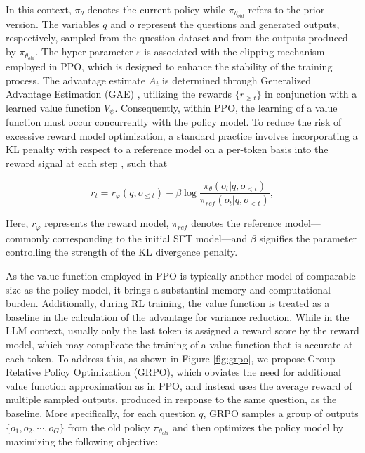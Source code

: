 \begin{itemize}[topsep=0pt]
\begin{itemize}[topsep=0pt]
In this context, $\pi_{\theta}$ denotes the current policy while $\pi_{\theta_{old}}$ refers to the prior version. The variables $q$ and $o$ represent the questions and generated outputs, respectively, sampled from the question dataset and from the outputs produced by $\pi_{\theta_{old}}$. The hyper-parameter $\varepsilon$ is associated with the clipping mechanism employed in PPO, which is designed to enhance the stability of the training process. The advantage estimate $A_t$ is determined through Generalized Advantage Estimation (GAE) \citep{gae}, utilizing the rewards $\{r_{\ge t}\}$ in conjunction with a learned value function $V_{\psi}$. Consequently, within PPO, the learning of a value function must occur concurrently with the policy model. To reduce the risk of excessive reward model optimization, a standard practice involves incorporating a KL penalty with respect to a reference model on a per-token basis into the reward signal at each step \citep{ouyang2022training}, such that

\begin{equation}
    r_{t} = r_\varphi(q, o_{\le t}) - \beta \log\frac{\pi_{\theta}(o_{t}|q, o_{<t})}{\pi_{ref}(o_{t}|q, o_{<t})},
\label{eq:PPO-reward}
\end{equation}

Here, $r_\varphi$ represents the reward model, $\pi_{ref}$ denotes the reference model—commonly corresponding to the initial SFT model—and $\beta$ signifies the parameter controlling the strength of the KL divergence penalty.

As the value function employed in PPO is typically another model of comparable size as the policy model, it brings a substantial memory and computational burden. Additionally, during RL training, the value function is treated as a baseline in the calculation of the advantage for variance reduction. While in the LLM context, usually only the last token is assigned a reward score by the reward model, which may complicate the training of a value function that is accurate at each token. To address this, as shown in Figure \ref{fig:grpo}, we propose Group Relative Policy Optimization (GRPO), which obviates the need for additional value function approximation as in PPO, and instead uses the average reward of multiple sampled outputs, produced in response to the same question, as the baseline. More specifically, for each question $q$, GRPO samples a group of outputs $\{o_1, o_2, \cdots, o_G\}$  from the old policy  $\pi_{\theta_{old}}$  and then optimizes the policy model by maximizing the following objective:


\end{itemize}
\end{itemize}
